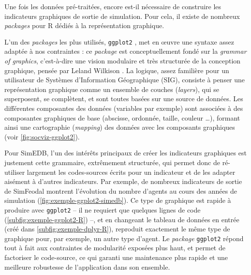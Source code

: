 	Une fois les données pré-traitées, encore est-il nécessaire de construire les indicateurs graphiques de sortie de simulation.
	Pour cela, il existe de nombreux \textit{packages} pour R dédiés à la représentation graphique.

	L'un des \textit{packages} les plus utilisés, \texttt{ggplot2} \autocite{wickham_ggplot2_2016}, met en œuvre une syntaxe assez adaptée à nos contraintes : ce \textit{package} est conceptuellement fondé sur la \og \textit{grammar of graphics}\fg{}, c'est-à-dire une vision modulaire et très structurée de la conception graphique, pensée par Leland Wilkison \autocite{wilkinson_grammar_2006}.
	La logique, assez familière pour un utilisateur de Systèmes d'Information Géographique (SIG), consiste à penser une représentation graphique comme un ensemble de couches (\textit{layers}), qui se superposent, se complètent, et sont toutes basées sur une source de données.
	Les différentes composantes des données (variables par exemple) sont associées à des composantes graphiques de base (abscisse, ordonnée, taille, couleur \ldots), formant ainsi une \og cartographie\fg{} (\textit{mapping}) des données avec les composants graphiques (voir \cref{fig:socviz-ggplot2}).

	Pour SimEDB, l'un des intérêts principaux de créer les indicateurs graphiques est justement cette grammaire, extrêmement structurée, qui permet donc de ré-utiliser largement les codes-sources écrits pour un indicateur et de les adapter aisément à d'autres indicateurs.
	Par exemple, de nombreux indicateurs de sortie de SimFeodal montrent l'évolution du nombre d'agents au cours des années de simulation (\cref{fig:exemple-ggplot2-simedb}).
	Ce type de graphique est rapide à produire avec \texttt{ggplot2} -- il ne requiert que quelques lignes de code (\cref{subfig:exemple-ggplot2-R}) --,
	et en changeant le tableau de données en entrée (créé dans \cref{subfig:exemple-dplyr-R}), reproduit exactement le même type de graphique pour, par exemple, un autre type d'agent.
	Le \textit{package} \texttt{ggplot2} répond tout à fait aux contraintes de modularité exposées plus haut, et permet de factoriser le code-source, ce qui garanti une maintenance plus rapide et une meilleure robustesse de l'application dans son ensemble.
	
	\clearpage

